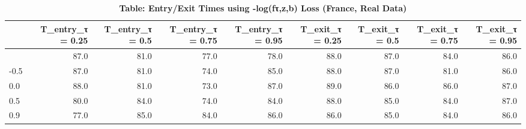 \begin{table}[t]
\caption*{
{\large \textbf{Table: Entry/Exit Times using -log(fτ,z,b) Loss (France, Real Data)}}
} 
\begin{tabular*}{\linewidth}{@{\extracolsep{\fill}}l|rrrrrrrr}
\toprule
 & T\_entry\_τ = 0.25 & T\_entry\_τ = 0.5 & T\_entry\_τ = 0.75 & T\_entry\_τ = 0.95 & T\_exit\_τ = 0.25 & T\_exit\_τ = 0.5 & T\_exit\_τ = 0.75 & T\_exit\_τ = 0.95 \\ 
\midrule\addlinespace[2.5pt]
-0.9 & 87.0 & 81.0 & 77.0 & 78.0 & 88.0 & 87.0 & 84.0 & 86.0 \\ 
-0.5 & 87.0 & 81.0 & 74.0 & 85.0 & 88.0 & 87.0 & 81.0 & 86.0 \\ 
0.0 & 88.0 & 81.0 & 73.0 & 87.0 & 89.0 & 86.0 & 86.0 & 87.0 \\ 
0.5 & 80.0 & 84.0 & 74.0 & 84.0 & 88.0 & 85.0 & 84.0 & 87.0 \\ 
0.9 & 77.0 & 85.0 & 84.0 & 86.0 & 86.0 & 85.0 & 84.0 & 86.0 \\ 
\bottomrule
\end{tabular*}
\end{table}


